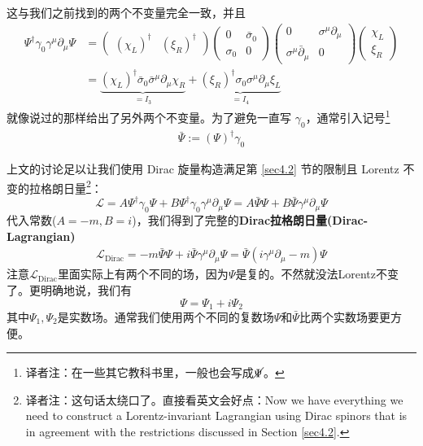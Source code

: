 这与我们之前找到的两个不变量完全一致，并且
\[\begin{split}
\Psi^\dagger\gamma_0\gamma^\mu\partial_\mu\Psi &= \begin{pmatrix}(\chi_L)^\dagger&(\xi_R)^\dagger\end{pmatrix}\begin{pmatrix}0&\bar\sigma_0\\\sigma_0&0\end{pmatrix}\begin{pmatrix}0&\sigma^\mu\partial_\mu\\\sigma^\mu\bar\partial_\mu&0\end{pmatrix}\begin{pmatrix}\chi_L\\\xi_R\end{pmatrix}\\
& =\underbrace{(\chi_L)^\dagger\bar\sigma_0\bar\sigma^\mu\partial_\mu\chi_R}_{=I_3}+\underbrace{(\xi_R)^\dagger\sigma_0\sigma^\mu\partial_\mu\xi_L}_{=I_4}
\end{split}\]
就像说过的那样给出了另外两个不变量。为了避免一直写 $\gamma_0$，通常引入记号\footnote{译者注：在一些其它教科书里，一般也会写成$\cancel{\Psi}$。}
\begin{align}
\label{equ6.15}
\bar\Psi:=(\Psi)^\dagger\gamma_0
\end{align}

上文的讨论足以让我们使用 Dirac 旋量构造满足第 \ref{sec4.2} 节的限制且 Lorentz 不变的拉格朗日量\footnote{译者注：这句话太绕口了。直接看英文会好点：Now we have everything we need to construct a Lorentz-invariant Lagrangian using Dirac spinors that is in agreement with the restrictions discussed in Section \ref{sec4.2}.}：
\[\mathscr{L}=A\Psi^\dagger\gamma_0\Psi+B\Psi^\dagger\gamma_0\gamma^\mu\partial_\mu\Psi=A\bar\Psi\Psi+ B\bar\Psi\gamma^\mu\partial_\mu\Psi\]
代入常数($A=-m,B=i$)，我们得到了完整的{\bfseries Dirac拉格朗日量(Dirac-Lagrangian)}
\begin{align}
\label{equ6.16}
\mathscr{L}_{\text{Dirac}}=-m\bar\Psi\Psi+ i\bar\Psi\gamma^\mu\partial_\mu\Psi=\bar\Psi(i\gamma^\mu\partial_\mu-m)\Psi
\end{align}
注意$\mathscr{L}_{\text{Dirac}}$里面实际上有两个不同的场，因为$\Psi$是复的。不然就没法Lorentz不变了。更明确地说，我们有
\[\Psi=\Psi_1+i\Psi_2 \]
其中$\Psi_1,\Psi_2$是实数场。通常我们使用两个不同的复数场$\Psi$和$\bar\Psi$比两个实数场要更方便。

